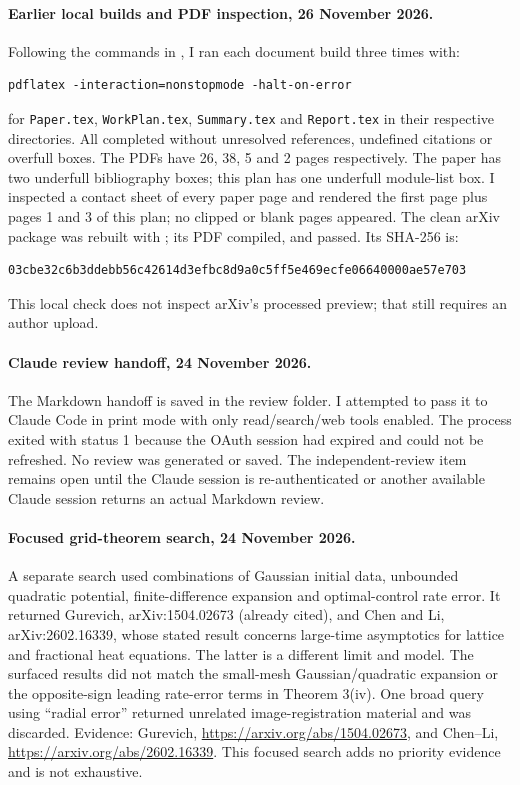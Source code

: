 \documentclass[11pt,a4paper]{article}
\begin{document}
\paragraph{Earlier local builds and PDF inspection, 26 November 2026.}
Following the commands in , I ran each document build three
times with:
\begin{verbatim}
pdflatex -interaction=nonstopmode -halt-on-error
\end{verbatim}
for \texttt{Paper.tex}, \texttt{WorkPlan.tex}, \texttt{Summary.tex} and
\texttt{Report.tex} in their respective directories. All completed without
unresolved references, undefined citations or overfull boxes. The PDFs have
26, 38, 5 and 2 pages respectively. The paper has two underfull bibliography
boxes; this plan has one underfull module-list box. I inspected a contact sheet
of every paper page and rendered the first page plus pages 1 and 3 of this
plan; no clipped or blank pages appeared. The clean arXiv package was rebuilt
with ; its PDF compiled, and
 passed. Its SHA-256 is:
\begin{verbatim}
03cbe32c6b3ddebb56c42614d3efbc8d9a0c5ff5e469ecfe06640000ae57e703
\end{verbatim}
This local check does not inspect arXiv's processed preview; that still
requires an author upload.

\paragraph{Claude review handoff, 24 November 2026.}
The Markdown handoff is saved in the review folder. I attempted to pass it to
Claude Code in print mode with only read/search/web tools enabled. The process
exited with status 1 because the OAuth session had expired and could not be
refreshed. No review was generated or saved. The independent-review item
remains open until the Claude session is re-authenticated or another
available Claude session returns an actual Markdown review.

\paragraph{Focused grid-theorem search, 24 November 2026.}
A separate search used combinations of Gaussian initial data, unbounded
quadratic potential, finite-difference expansion and optimal-control rate
error. It returned Gurevich, arXiv:1504.02673 (already cited), and Chen and
Li, arXiv:2602.16339, whose stated result concerns large-time asymptotics for
lattice and fractional heat equations. The latter is a different limit and
model. The surfaced results did not match the small-mesh Gaussian/quadratic
expansion or the opposite-sign leading rate-error terms in Theorem 3(iv).
One broad query using “radial error” returned unrelated image-registration
material and was discarded. Evidence: Gurevich,
\url{https://arxiv.org/abs/1504.02673}, and Chen--Li,
\url{https://arxiv.org/abs/2602.16339}. This focused search adds no
priority evidence and is not exhaustive.
\end{document}

